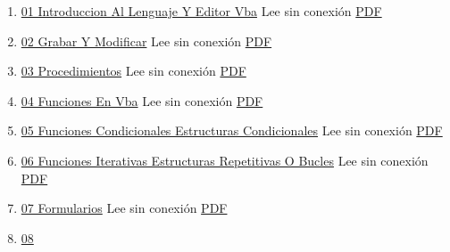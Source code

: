 \documentclass[
  jou,
  floatsintext,
  longtable,
  a4paper,
  nolmodern,
  notxfonts,
  notimes,
  colorlinks=true,linkcolor=blue,citecolor=blue,urlcolor=blue]{apa7}
\providecommand{\tightlist}{%
  \setlength{\itemsep}{0pt}\setlength{\parskip}{0pt}}
\begin{document}
\begin{enumerate}
\def\labelenumi{\arabic{enumi}.}
\tightlist
\item
  \href{https://achalmaedison.netlify.app/herramientas-oficina/ofimatica/2022-12-05-01-introduccion-al-lenguaje-y-editor-vba}{01
  Introduccion Al Lenguaje Y Editor Vba} Lee sin conexión
  \href{https://achalmaedison.netlify.app/herramientas-oficina/ofimatica/2022-12-05-01-introduccion-al-lenguaje-y-editor-vba/index.pdf}{PDF}
\item
  \href{https://achalmaedison.netlify.app/herramientas-oficina/ofimatica/2022-12-12-02-grabar-y-modificar}{02
  Grabar Y Modificar} Lee sin conexión
  \href{https://achalmaedison.netlify.app/herramientas-oficina/ofimatica/2022-12-12-02-grabar-y-modificar/index.pdf}{PDF}
\item
  \href{https://achalmaedison.netlify.app/herramientas-oficina/ofimatica/2022-12-19-03-procedimientos}{03
  Procedimientos} Lee sin conexión
  \href{https://achalmaedison.netlify.app/herramientas-oficina/ofimatica/2022-12-19-03-procedimientos/index.pdf}{PDF}
\item
  \href{https://achalmaedison.netlify.app/herramientas-oficina/ofimatica/2022-12-26-04-funciones-en-vba}{04
  Funciones En Vba} Lee sin conexión
  \href{https://achalmaedison.netlify.app/herramientas-oficina/ofimatica/2022-12-26-04-funciones-en-vba/index.pdf}{PDF}
\item
  \href{https://achalmaedison.netlify.app/herramientas-oficina/ofimatica/2023-01-02-05-funciones-condicionales-estructuras-condicionales}{05
  Funciones Condicionales Estructuras Condicionales} Lee sin conexión
  \href{https://achalmaedison.netlify.app/herramientas-oficina/ofimatica/2023-01-02-05-funciones-condicionales-estructuras-condicionales/index.pdf}{PDF}
\item
  \href{https://achalmaedison.netlify.app/herramientas-oficina/ofimatica/2023-01-09-06-funciones-iterativas-estructuras-repetitivas-o-bucles}{06
  Funciones Iterativas Estructuras Repetitivas O Bucles} Lee sin
  conexión
  \href{https://achalmaedison.netlify.app/herramientas-oficina/ofimatica/2023-01-09-06-funciones-iterativas-estructuras-repetitivas-o-bucles/index.pdf}{PDF}
\item
  \href{https://achalmaedison.netlify.app/herramientas-oficina/ofimatica/2023-01-16-07-formularios}{07
  Formularios} Lee sin conexión
  \href{https://achalmaedison.netlify.app/herramientas-oficina/ofimatica/2023-01-16-07-formularios/index.pdf}{PDF}
\item
  \href{https://achalmaedison.netlify.app/herramientas-oficina/ofimatica/2023-01-23-08-eventos}{08
}
\end{enumerate}
\end{document}
